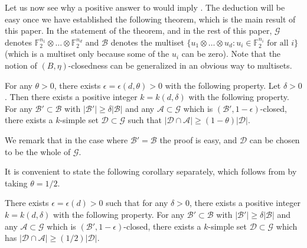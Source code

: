\documentclass{toc}
\newcommand\eps{\epsilon}  %
\newcommand\F{\mathbb{F}}
\renewcommand\d{\delta}
\newcommand \cA{\mathcal A}
\newcommand \cB{\mathcal B}
\newcommand \cD{\mathcal D}
\newcommand \cG{\mathcal G}
\begin{document}
Let us now see why a positive answer to  would imply . The deduction will be easy once we have established the following theorem, which is the main result of this paper. In the statement of the theorem, and in the rest of this paper, $\cG$ denotes $\F_2^{n_1}\otimes \dots \otimes \F_2^{n_d}$ and $\cB$ denotes the multiset $\{u_1\otimes \dots \otimes u_d: u_i\in \F_2^{n_i} \text{ for all } i\}$ (which is a multiset only because some of the $u_i$ can be zero). Note that the notion of $(B,\eta)$-closedness can be generalized in an obvious way to multisets.

\begin{theorem} \label{mainresult}
	For any $\theta>0$, there exists $\eps=\eps(d,\theta)>0$ with the following property. Let $\delta>0$. Then there exists a positive integer $k=k(d,\d)$ with the following property. For any $\cB'\subset \cB$ with $|\cB'|\geq \d |\cB|$ and any $\cA\subset \cG$ which is  $(\cB',1-\eps)$-closed, there exists a $k$-simple set $\cD\subset \cG$ such that $|\cD\cap \cA|\geq (1-\theta)|\cD|$.
\end{theorem}

\noindent We remark that in the case where $\cB'=\cB$ the proof is easy, and $\cD$ can be chosen to be the whole of $\cG$.
%
%
%
%
%
%
%
%

It is convenient to state the following corollary separately, which follows from  by taking $\theta=1/2$.

\begin{corollary} \label{maincorollary}
	There exists $\eps=\eps(d)>0$ such that for any $\delta>0$, there exists a positive integer $k=k(d,\d)$ with the following property. For any $\cB'\subset \cB$ with $|\cB'|\geq \d |\cB|$ and any $\cA\subset \cG$ which is  $(\cB',1-\eps)$-closed, there exists a $k$-simple set $\cD\subset \cG$ which has $|\cD\cap \cA|\geq ({1}/{2})|\cD|$.
\end{corollary}
\end{document}
